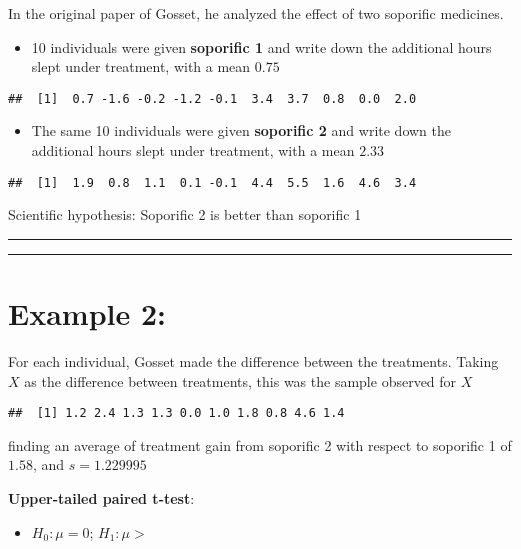 \documentclass[
]{book}
\providecommand{\tightlist}{%
  \setlength{\itemsep}{0pt}\setlength{\parskip}{0pt}}
\begin{document}
In the original paper of Gosset, he analyzed the effect of two soporific medicines.

\begin{itemize}
\tightlist
\item
  10 individuals were given \textbf{soporific 1} and write down the additional hours slept under treatment, with a mean \(0.75\)
\end{itemize}

\begin{verbatim}
##  [1]  0.7 -1.6 -0.2 -1.2 -0.1  3.4  3.7  0.8  0.0  2.0
\end{verbatim}

\begin{itemize}
\tightlist
\item
  The same 10 individuals were given \textbf{soporific 2} and write down the additional hours slept under treatment, with a mean \(2.33\)
\end{itemize}

\begin{verbatim}
##  [1]  1.9  0.8  1.1  0.1 -0.1  4.4  5.5  1.6  4.6  3.4
\end{verbatim}

Scientific hypothesis: Soporific 2 is better than soporific 1

\begin{center}\rule{0.5\linewidth}{0.5pt}\end{center}

\begin{center}\rule{0.5\linewidth}{0.5pt}\end{center}

\hypertarget{example-2-4}{%
\section{Example 2:}\label{example-2-4}}

For each individual, Gosset made the difference between the treatments. Taking \(X\) as the difference between treatments, this was the sample observed for \(X\)

\begin{verbatim}
##  [1] 1.2 2.4 1.3 1.3 0.0 1.0 1.8 0.8 4.6 1.4
\end{verbatim}

finding an average of treatment gain from soporific 2 with respect to soporific 1 of \(1.58\), and \(s=1.229995\)

\textbf{Upper-tailed paired t-test}:

\begin{itemize}
\tightlist
\item
  \(H_0:\mu=0\); \(H_1:\mu >\)
\end{itemize}
\end{document}
